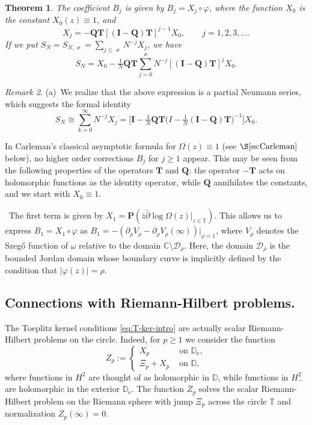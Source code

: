 \documentclass{amsart}
\newcommand{\be}{\begin{equation}}
\newcommand{\ee}{\end{equation}}
\newcommand{\D}{\mathbb{D}}
\newcommand{\T}{\mathbb{T}}
\newcommand{\calD}{\mathcal{D}}
\newcommand{\Pop}{\mathbf{P}}
\newcommand{\Top}{\mathbf{T}}
\newcommand{\Iop}{\mathbf{I}}
\newcommand{\Qop}{\mathbf{Q}}
\newtheorem{thm}{Theorem}[subsection]
\theoremstyle{definition}
\theoremstyle{remark}
\newtheorem{rem}[thm]{Remark}
\newcommand{\e}{\mathrm{e}}
\numberwithin{equation}{subsection}
\begin{document}
\begin{thm}\label{thm:coeff}
The coefficient $B_j$ is given by $B_j=X_j\circ \varphi$,
where the function $X_0$ is the constant $X_0(z)\equiv 1$, and
\be
X_j= -\Qop\Top[(\Iop-\Qop)\Top]^{j-1}X_0,\qquad j=1,2,3,\ldots.
\ee
If we put $S_N=S_{N,\varkappa}
=\sum_{j\le \varkappa} N^{-j}X_j$, we have
\be
S_N= 
X_0-\tfrac{1}{N}\Qop\Top\sum_{j=0}^{\varkappa}N^{-j}[(\Iop-\Qop)\Top]^{j}X_0.
\ee
\end{thm}
\begin{rem}\label{rem:coeff}{\rm (a)}\,
We realize that the above expression is a partial Neumann series,
which suggests the formal identity
\be
S_N\cong \sum_{k= 0}^\infty N^{-j}X_j
=\Big[\Iop-\tfrac{1}{N}\Qop\Top\Big(I-\tfrac{1}{N}
(\Iop-\Qop)\Top\Big)^{-1}\Big]X_0.
\ee

\;
In Carleman's classical asymptotic formula for 
$\Omega(z)\equiv 1$ (see $\S\ref{ss:Carleman}$ below),
no higher order corrections $B_j$ for $j\ge 1$ appear.
This may be seen from the following properties of the 
operators $\Top$ and $\Qop$:
the operator $-\Top$ acts on holomorphic functions
as the identity operator, while $\Qop$
annihilates the constants, and we start with $X_0\equiv 1$.

\,
The first term is given by $X_1=\Pop (\bar z\bar\partial\log\Omega(z)\vert_{z\in\T})$. 
This allows us to express $B_1=X_1\circ\varphi$ as 
$B_1=-(\partial_\rho V_\rho-\partial_\rho V_\rho(\infty))\vert_{\rho=1}$,
where $V_\rho$ denotes the Szeg\H{o}  
function of $\omega$ relative to the domain $\mathbb{C}\setminus \mathcal{D}_\rho$. 
Here, the domain $\calD_\rho$ is the bounded Jordan domain whose boundary curve
is implicitly defined by the condition that
$|\varphi(z)|=\rho$.
\end{rem}

\subsection{Connections with Riemann-Hilbert problems.}
\label{ss:RHP}
The Toeplitz kernel conditions \eqref{eq:T-ker-intro} are actually 
scalar Riemann-Hilbert problems on the circle. Indeed, for $p\ge 1$ we consider 
the function
\be\label{eq:RHP}
Z_p:=
\begin{cases}
X_p&\text{ on }\D_\e,\\
\Xi_p+X_p& \text{ on }\D,
\end{cases}
\ee
where functions in $H^2$ are thought of as holomorphic in $\D$, 
while functions in $H^2_{-}$ are holomorphic
in the exterior $\D_\e$. The function $Z_p$ 
solves the scalar Riemann-Hilbert problem
on the Riemann sphere with jump $\Xi_p$ across the circle 
$\T$ and normalization $Z_p(\infty)=0$.
\end{document}
